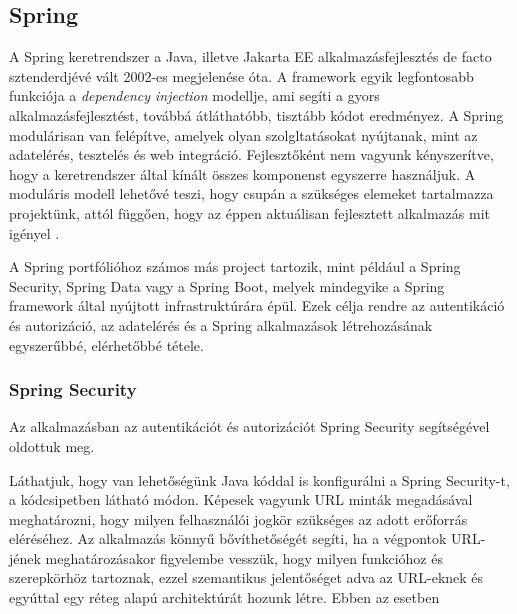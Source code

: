 \subsection{Spring}

A Spring keretrendszer a Java, illetve Jakarta EE alkalmazásfejlesztés de facto sztenderdjévé vált 2002-es megjelenése óta. A framework egyik legfontosabb funkciója a \emph{dependency injection} modellje, ami segíti a gyors alkalmazásfejlesztést, továbbá átláthatóbb, tisztább kódot eredményez. A Spring modulárisan van felépítve, amelyek olyan szolgltatásokat nyújtanak, mint az adatelérés, tesztelés és web integráció. Fejlesztőként nem vagyunk kényszerítve, hogy a keretrendszer által kínált összes komponenst egyszerre használjuk. A moduláris modell lehetővé teszi, hogy csupán a szükséges elemeket tartalmazza projektünk, attól függően, hogy az éppen aktuálisan fejlesztett alkalmazás mit igényel \cite{buildingSpringRest}.\par

A Spring portfólióhoz számos más project tartozik, mint például a Spring Security, Spring Data vagy a Spring Boot, melyek mindegyike a Spring framework által nyújtott infrastruktúrára épül. Ezek célja rendre az autentikáció és autorizáció, az adatelérés és a Spring alkalmazások létrehozásának egyszerűbbé, elérhetőbbé tétele. \par

\subsubsection{Spring Security}

Az alkalmazásban az autentikációt és autorizációt Spring Security segítségével oldottuk meg.


Láthatjuk, hogy van lehetőségünk Java kóddal is konfigurálni a Spring Security-t, a kódcsipetben látható módon. Képesek vagyunk URL minták megadásával meghatározni, hogy milyen felhasználói jogkör szükséges az adott erőforrás eléréséhez. Az alkalmazás könnyű bővíthetőségét segíti, ha a végpontok URL-jének meghatározásakor figyelembe vesszük, hogy milyen funkcióhoz és szerepkörhöz tartoznak, ezzel szemantikus jelentőséget adva az URL-eknek és egyúttal egy réteg alapú architektúrát hozunk létre. Ebben az esetben

